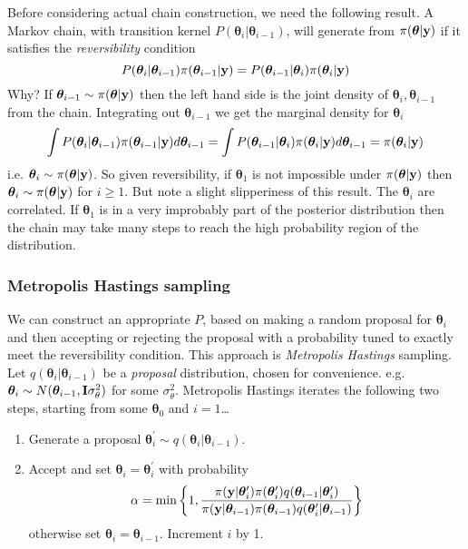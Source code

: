 \documentclass[10pt] {article}
\theoremstyle{definition}
\begin{document}
Before considering actual chain construction, we need the following result. A Markov chain, with transition kernel $P({\bm \theta}_i|{\bm \theta}_{i-1})$, will generate from $\pi( {\bm \theta}|{\bf y})$ if it satisfies the {\em reversibility} condition
$$
P({\bm \theta}_i|{\bm \theta}_{i-1}) \pi( {\bm \theta}_{i-1}|{\bf y}) = P({\bm \theta}_{i-1}|{\bm \theta}_{i}) \pi( {\bm \theta}_i|{\bf y})
$$
Why? If ${\bm \theta}_{i-1} \sim \pi( {\bm \theta}|{\bf y}) $ then the left hand side is the joint density of ${\bm \theta}_i, {\bm \theta}_{i-1}$ from the chain. Integrating out ${\bm \theta}_{i-1}$ we get the marginal density  for ${\bm \theta}_i$
$$
\int P({\bm \theta}_i|{\bm \theta}_{i-1}) \pi( {\bm \theta}_{i-1}|{\bf y}) d {\bm \theta}_{i-1} = \int P({\bm \theta}_{i-1}|{\bm \theta}_{i}) \pi( {\bm \theta}_i|{\bf y}) d {\bm \theta}_{i-1} = \pi( {\bm \theta}_i|{\bf y})
$$
i.e. ${\bm \theta}_{i} \sim \pi( {\bm \theta}|{\bf y}) $. So given reversibility, if ${\bm \theta}_1$ is not impossible under $\pi( {\bm \theta}|{\bf y})$ then  ${\bm \theta}_{i} \sim \pi( {\bm \theta}|{\bf y})$ for $i \ge 1$. But note a slight slipperiness of this result. The ${\bm \theta}_i$ are correlated. If ${\bm \theta}_1$ is in a very improbably part of the posterior distribution then the chain may take many steps to reach the high probability region of the distribution.

\subsubsection{Metropolis Hastings sampling}

We can construct an appropriate $P$, based on making a random proposal for ${\bm \theta}_i$ and then accepting or rejecting the proposal with a probability tuned to exactly meet the reversibility condition. This approach is {\em Metropolis Hastings} sampling. Let $q({\bm \theta}_i|{\bm \theta}_{i-1})$ be a {\em proposal} distribution, chosen for convenience. e.g. ${\bm \theta}_i \sim N({\bm \theta}_{i-1},{\bf I}\sigma_\theta^2)$ for some $\sigma_\theta^2$. Metropolis Hastings iterates the following two steps, starting from some ${\bm \theta}_0$ and $i=1$\ldots
\begin{enumerate}
\item Generate a proposal ${\bm \theta}_i^\prime \sim q({\bm \theta}_i|{\bm \theta}_{i-1})$.
\item Accept and set ${\bm \theta}_i = {\bm \theta}_i^\prime$ with probability
$$
\alpha = \text{min}\left \{ 1, \frac{\pi({\bf y} | {\bm \theta}_i^\prime)\pi({\bm \theta}_i^\prime)q({\bm \theta}_{i-1}|{\bm \theta}_{i}^\prime)}{
\pi({\bf y} | {\bm \theta}_{i-1})\pi({\bm \theta}_{i-1})q({\bm \theta}_{i}^\prime|{\bm \theta}_{i-1})
}
\right \}
$$
otherwise set ${\bm \theta}_i = {\bm \theta}_{i-1}$. Increment $i$ by 1.
\end{enumerate}
\end{document}
